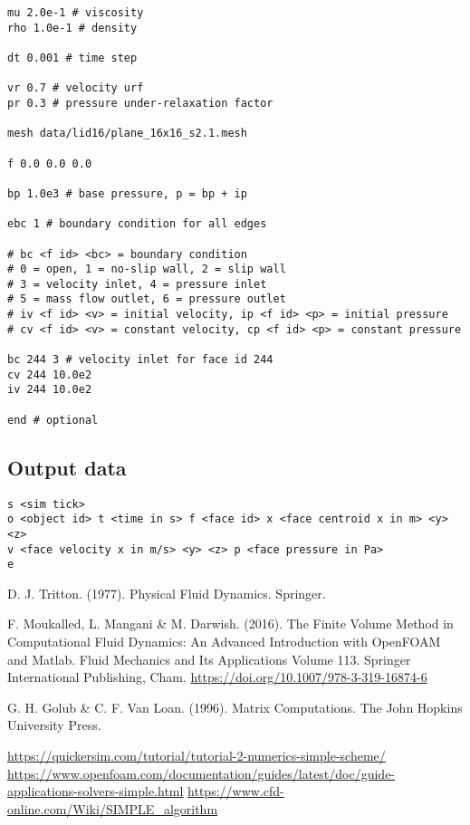 \documentclass[12pt]{article}
\begin{document}
\begin{verbatim}
mu 2.0e-1 # viscosity
rho 1.0e-1 # density

dt 0.001 # time step

vr 0.7 # velocity urf
pr 0.3 # pressure under-relaxation factor

mesh data/lid16/plane_16x16_s2.1.mesh

f 0.0 0.0 0.0

bp 1.0e3 # base pressure, p = bp + ip

ebc 1 # boundary condition for all edges

# bc <f id> <bc> = boundary condition
# 0 = open, 1 = no-slip wall, 2 = slip wall
# 3 = velocity inlet, 4 = pressure inlet
# 5 = mass flow outlet, 6 = pressure outlet
# iv <f id> <v> = initial velocity, ip <f id> <p> = initial pressure
# cv <f id> <v> = constant velocity, cp <f id> <p> = constant pressure

bc 244 3 # velocity inlet for face id 244
cv 244 10.0e2
iv 244 10.0e2

end # optional
\end{verbatim}

\subsection{Output data}

\begin{verbatim}
s <sim tick>
o <object id> t <time in s> f <face id> x <face centroid x in m> <y> <z> 
v <face velocity x in m/s> <y> <z> p <face pressure in Pa>
e
\end{verbatim}

\begin{thebibliography}{9}
   D. J. Tritton. (1977). Physical Fluid Dynamics. Springer.
  
 F. Moukalled, L. Mangani \& M. Darwish. (2016). The Finite Volume Method in Computational Fluid Dynamics: An Advanced Introduction with OpenFOAM and Matlab. Fluid Mechanics and Its Applications Volume 113. Springer International Publishing, Cham. \url{https://doi.org/10.1007/978-3-319-16874-6}

   G. H. Golub \& C. F. Van Loan. (1996). Matrix Computations. The John Hopkins University Press.
  
 \url{https://quickersim.com/tutorial/tutorial-2-numerics-simple-scheme/}
 \url{https://www.openfoam.com/documentation/guides/latest/doc/guide-applications-solvers-simple.html}
 \url{https://www.cfd-online.com/Wiki/SIMPLE_algorithm}

\end{thebibliography}
\end{document}
